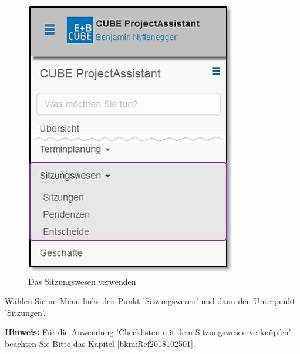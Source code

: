 \begin{figure}   %
  \vspace{-35pt}      %
  \begin{center}
    \includegraphics[width=1\linewidth]{../chapters/05_Sitzungswesen/pictures/5-1_Menu_Sitzungswesen.jpg}
  \end{center}
  \vspace{-20pt}
  \caption{Das Sitzungswesen verwenden}
  \vspace{-10pt}
\end{figure}

Wählen Sie im Menü links den Punkt 'Sitzungswesen' und dann den Unterpunkt 'Sitzungen'.

\vspace{5cm}

\textbf{Hinweis:} Für die Anwendung 'Checklisten mit dem Sitzungswesen verknüpfen' beachten Sie Bitte das Kapitel \ref{bkm:Ref2018102501}.

